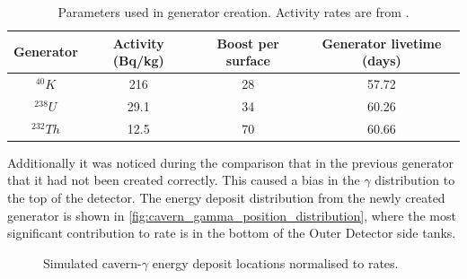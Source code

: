 \begin{table}[!htbp]
    \centering
    \begin{tabular}{c|c|c|c}
        Generator    & Activity (Bq/kg) & Boost per surface & Generator livetime (days)  \\ \hline
        ${}^{40}K$   & 216              & 28                & 57.72                      \\
        ${}^{238}U$  & 29.1             & 34                & 60.26                      \\
        ${}^{232}Th$ & 12.5             & 70                & 60.66
    \end{tabular}
    \caption{Parameters used in generator creation. Activity rates are from \cite{LZ_Gamma_Ray_Background_ref}.}
    \label{tab:cavern_gamma_generator_parameters}
\end{table}





\par
Additionally it was noticed during the comparison that in the previous generator that it had not been created correctly.
This caused a bias in the $\gamma$ distribution to the top of the detector.
The energy deposit distribution from the newly created generator is shown in \autoref{fig:cavern_gamma_position_distribution}, where the most significant contribution to rate is in the bottom of the Outer Detector side tanks.

\begin{figure}
    \centering
    \resizebox{\textwidth}{!}{

}
    \caption{Simulated cavern-$\gamma$ energy deposit locations normalised to rates.}
    \label{fig:cavern_gamma_position_distribution}
\end{figure}
